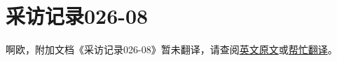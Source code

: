 \renewcommand{\DOCNAME}{采访记录026-08}
\renewcommand{\DOCSLUG}{interview-log-026-08}

\section{\DOCNAME}

\label{sec:DOC-\DOCSLUG}

啊欧，附加文档《\DOCNAME 》暂未翻译，请查阅\href{http://scp-wiki.wikidot.com/\DOCSLUG}{英文原文}或\href{http://scp-wiki-cn.wikidot.com/\DOCSLUG}{帮忙翻译}。
